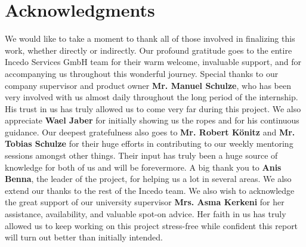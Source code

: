 \section*{Acknowledgments}

We would like to take a moment to thank all of those involved in finalizing this work, whether directly or indirectly. Our profound gratitude goes to the entire Incedo Services GmbH team for their warm welcome, invaluable support, and for accompanying us throughout this wonderful journey. Special thanks to our company supervisor and product owner \textbf{Mr. Manuel Schulze}, who has been very involved with us almost daily throughout the long period of the internship. His trust in us has truly allowed us to come very far during this project. We also appreciate \textbf{Wael Jaber} for initially showing us the ropes and for his continuous guidance. Our deepest gratefulness also goes to \textbf{Mr. Robert Könitz} and \textbf{Mr. Tobias Schulze} for their huge efforts in contributing to our weekly mentoring sessions amongst other things. Their input has truly been a huge source of knowledge for both of us and will be forevermore. A big thank you to \textbf{Anis Benna}, the leader of the project, for helping us a lot in several areas. We also extend our thanks to the rest of the Incedo team. We also wish to acknowledge the great support of our university supervisor \textbf{Mrs. Asma Kerkeni} for her assistance, availability, and valuable spot-on advice. Her faith in us has truly allowed us to keep working on this project stress-free while confident this report will turn out better than initially intended.

\newpage
